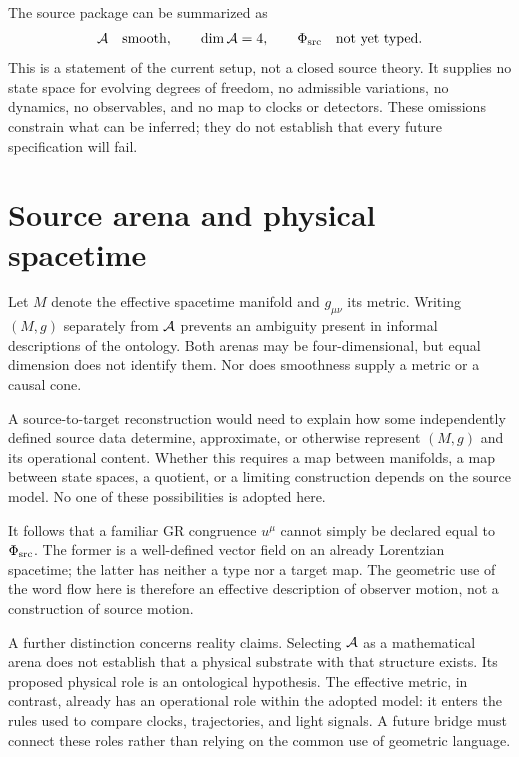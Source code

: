 \documentclass[11pt]{article}
\begin{document}
The source package can be summarized as
\begin{equation}
\mathcal A\quad\hbox{smooth},\qquad \dim\mathcal A=4,\qquad
\Phi_{\mathrm{src}}\quad\hbox{not yet typed}.
\end{equation}
This is a statement of the current setup, not a closed source theory. It supplies no state space for evolving degrees of freedom, no admissible variations, no dynamics, no observables, and no map to clocks or detectors. These omissions constrain what can be inferred; they do not establish that every future specification will fail.

\section{Source arena and physical spacetime}
Let $M$ denote the effective spacetime manifold and $g_{\mu\nu}$ its metric. Writing $(M,g)$ separately from $\mathcal A$ prevents an ambiguity present in informal descriptions of the ontology. Both arenas may be four-dimensional, but equal dimension does not identify them. Nor does smoothness supply a metric or a causal cone.

A source-to-target reconstruction would need to explain how some independently defined source data determine, approximate, or otherwise represent $(M,g)$ and its operational content. Whether this requires a map between manifolds, a map between state spaces, a quotient, or a limiting construction depends on the source model. No one of these possibilities is adopted here.

It follows that a familiar GR congruence $u^\mu$ cannot simply be declared equal to $\Phi_{\mathrm{src}}$. The former is a well-defined vector field on an already Lorentzian spacetime; the latter has neither a type nor a target map. The geometric use of the word flow here is therefore an effective description of observer motion, not a construction of source motion.

A further distinction concerns reality claims. Selecting $\mathcal A$ as a mathematical arena does not establish that a physical substrate with that structure exists. Its proposed physical role is an ontological hypothesis. The effective metric, in contrast, already has an operational role within the adopted model: it enters the rules used to compare clocks, trajectories, and light signals. A future bridge must connect these roles rather than relying on the common use of geometric language.
\end{document}
